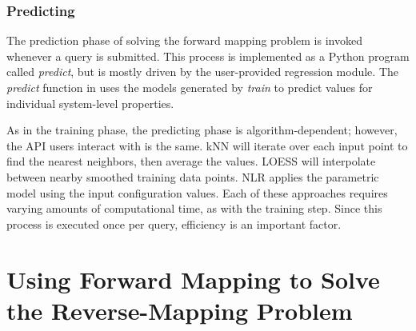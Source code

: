 \subsubsection{Predicting}

The prediction phase of solving the forward mapping problem  is invoked whenever a query is submitted.
This process is implemented as a Python program called \textit{predict}, but is mostly driven by the user-provided regression module.
The \textit{predict} function in \fw uses the models generated by \textit{train} to predict values for individual system-level properties.

As in the training phase, the predicting phase is algorithm-dependent; however, the API users interact with is the same.
kNN will iterate over each input point to find the nearest neighbors, then average the values.
LOESS will interpolate between nearby smoothed training data points.
NLR applies the parametric model using the input configuration values.
Each of these approaches requires varying amounts of computational time, as with the training step.
Since this process is executed once per  query, efficiency is an important factor.


\section{Using Forward Mapping to Solve the Reverse-Mapping Problem}

